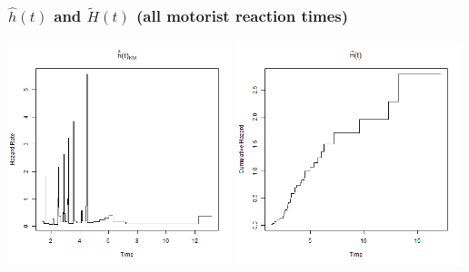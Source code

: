 \begin{frame}
\frametitle{$\hat{h}(t)$ and $\tilde{H}(t)$ (all motorist reaction times)}
\includegraphics[width=0.49\textwidth]{Figures/KM_haz_allmotorists.png}
\includegraphics[width=0.49\textwidth]{Figures/KM_chaz_allmotorists.png}
\end{frame}

